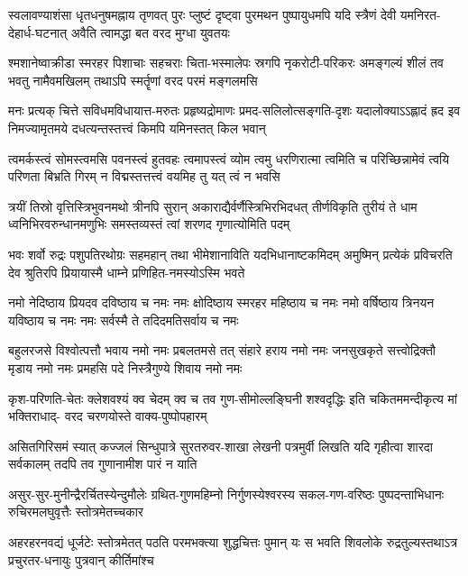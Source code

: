 \fourlineindentedshloka
{स्वलावण्याशंसा धृतधनुषमह्नाय तृणवत्}
{पुरः प्लुष्टं दृष्ट्वा पुरमथन पुष्पायुधमपि}
{यदि स्त्रैणं देवी यमनिरत-देहार्ध-घटनात्}
{अवैति त्वामद्धा बत वरद मुग्धा युवतयः}%

\fourlineindentedshloka
{श्मशानेष्वाक्रीडा स्मरहर पिशाचाः सहचराः}
{चिता-भस्मालेपः स्रगपि नृकरोटी-परिकरः}
{अमङ्गल्यं शीलं तव भवतु नामैवमखिलम्}
{तथाऽपि स्मर्तॄणां वरद परमं मङ्गलमसि}%

\fourlineindentedshloka
{मनः प्रत्यक् चित्ते सविधमविधायात्त-मरुतः}
{प्रहृष्यद्रोमाणः प्रमद-सलिलोत्सङ्गति-दृशः}
{यदालोक्याऽऽह्लादं ह्रद इव निमज्यामृतमये}
{दधत्यन्तस्तत्त्वं किमपि यमिनस्तत् किल भवान्}%

\fourlineindentedshloka
{त्वमर्कस्त्वं सोमस्त्वमसि पवनस्त्वं हुतवहः}
{त्वमापस्त्वं व्योम त्वमु धरणिरात्मा त्वमिति च}
{परिच्छिन्नामेवं त्वयि परिणता बिभ्रति गिरम्}
{न विद्मस्तत्तत्त्वं वयमिह तु यत् त्वं न भवसि}%

\fourlineindentedshloka
{त्रयीं तिस्रो वृत्तिस्त्रिभुवनमथो त्रीनपि सुरान्}
{अकाराद्यैर्वर्णैस्त्रिभिरभिदधत् तीर्णविकृति}
{तुरीयं ते धाम ध्वनिभिरवरुन्धानमणुभिः}
{समस्तव्यस्तं त्वां शरणद गृणात्योमिति पदम्}%

\fourlineindentedshloka
{भवः शर्वो रुद्रः पशुपतिरथोग्रः सहमहान्}
{तथा भीमेशानाविति यदभिधानाष्टकमिदम्}
{अमुष्मिन् प्रत्येकं प्रविचरति देव श्रुतिरपि}
{प्रियायास्मै धाम्ने प्रणिहित-नमस्योऽस्मि भवते}%

\fourlineindentedshloka
{नमो नेदिष्ठाय प्रियदव दविष्ठाय च नमः}
{नमः क्षोदिष्ठाय स्मरहर महिष्ठाय च नमः}
{नमो वर्षिष्ठाय त्रिनयन यविष्ठाय च नमः}
{नमः सर्वस्मै ते तदिदमतिसर्वाय च नमः}%

\fourlineindentedshloka
{बहुलरजसे विश्वोत्पत्तौ भवाय नमो नमः}
{प्रबलतमसे तत् संहारे हराय नमो नमः}
{जनसुखकृते सत्त्वोद्रिक्तौ मृडाय नमो नमः}
{प्रमहसि पदे निस्त्रैगुण्ये शिवाय नमो नमः}%

\fourlineindentedshloka
{कृश-परिणति-चेतः क्लेशवश्यं क्व चेदम्}
{क्व च तव गुण-सीमोल्लङ्घिनी शश्वदृद्धिः}
{इति चकितममन्दीकृत्य मां भक्तिराधाद्-}
{वरद चरणयोस्ते वाक्य-पुष्पोपहारम्}%

\fourlineindentedshloka
{असितगिरिसमं स्यात् कज्जलं सिन्धुपात्रे}
{सुरतरुवर-शाखा लेखनी पत्रमुर्वी}
{लिखति यदि गृहीत्वा शारदा सर्वकालम्}
{तदपि तव गुणानामीश पारं न याति}%

\fourlineindentedshloka
{असुर-सुर-मुनीन्द्रैरर्चितस्येन्दुमौलेः}
{ग्रथित-गुणमहिम्नो निर्गुणस्येश्वरस्य}
{सकल-गण-वरिष्ठः पुष्पदन्ताभिधानः}
{रुचिरमलघुवृत्तैः स्तोत्रमेतच्चकार}%

\fourlineindentedshloka
{अहरहरनवद्यं धूर्जटेः स्तोत्रमेतत्}
{पठति परमभक्त्या शुद्धचित्तः पुमान् यः}
{स भवति शिवलोके रुद्रतुल्यस्तथाऽत्र}
{प्रचुरतर-धनायुः पुत्रवान् कीर्तिमांश्च}%

